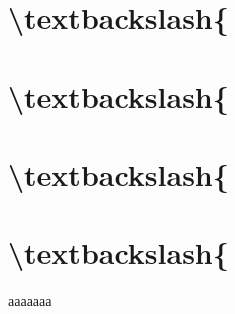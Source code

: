 \documentclass[paper=a4, fontsize=14pt, pagesize, DIV=calc, oneside]{scrreport}
\begin{document}

\chapter{\textbackslash{}textbackslash\{}




\chapter{\textbackslash{}textbackslash\{}




\chapter{\textbackslash{}textbackslash\{}




\chapter{\textbackslash{}textbackslash\{}



ааааааа


\newpage
\printbibliography[heading=bibintoc, title={Список использованных источников}]
\end{document}
